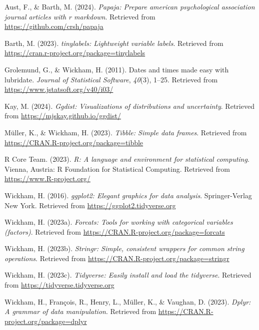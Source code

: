 \documentclass[
  man,floatsintext]{apa6}
\newlength{\cslhangindent}
\newenvironment{CSLReferences}[2] %
 {\begin{list}{}{%
  \setlength{\itemindent}{0pt}
  \setlength{\leftmargin}{0pt}
  \setlength{\parsep}{0pt}
  \ifodd #1
   \setlength{\leftmargin}{\cslhangindent}
   \setlength{\itemindent}{-1\cslhangindent}
  \fi
  \setlength{\itemsep}{#2\baselineskip}}}
 {\end{list}}
\begin{document}
\label{refs}
\begin{CSLReferences}{1}{0}
Aust, F., \& Barth, M. (2024). \emph{Papaja: Prepare american psychological association journal articles with r markdown}. Retrieved from \url{https://github.com/crsh/papaja}

Barth, M. (2023). \emph{{tinylabels}: Lightweight variable labels}. Retrieved from \url{https://cran.r-project.org/package=tinylabels}

Grolemund, G., \& Wickham, H. (2011). Dates and times made easy with {lubridate}. \emph{Journal of Statistical Software}, \emph{40}(3), 1--25. Retrieved from \url{https://www.jstatsoft.org/v40/i03/}

Kay, M. (2024). \emph{Ggdist: Visualizations of distributions and uncertainty}. Retrieved from \url{https://mjskay.github.io/ggdist/}

Müller, K., \& Wickham, H. (2023). \emph{Tibble: Simple data frames}. Retrieved from \url{https://CRAN.R-project.org/package=tibble}

R Core Team. (2023). \emph{R: A language and environment for statistical computing}. Vienna, Austria: R Foundation for Statistical Computing. Retrieved from \url{https://www.R-project.org/}

Wickham, H. (2016). \emph{ggplot2: Elegant graphics for data analysis}. Springer-Verlag New York. Retrieved from \url{https://ggplot2.tidyverse.org}

Wickham, H. (2023a). \emph{Forcats: Tools for working with categorical variables (factors)}. Retrieved from \url{https://CRAN.R-project.org/package=forcats}

Wickham, H. (2023b). \emph{Stringr: Simple, consistent wrappers for common string operations}. Retrieved from \url{https://CRAN.R-project.org/package=stringr}

Wickham, H. (2023c). \emph{Tidyverse: Easily install and load the tidyverse}. Retrieved from \url{https://tidyverse.tidyverse.org}

Wickham, H., François, R., Henry, L., Müller, K., \& Vaughan, D. (2023). \emph{Dplyr: A grammar of data manipulation}. Retrieved from \url{https://CRAN.R-project.org/package=dplyr}


\end{CSLReferences}
\end{document}
